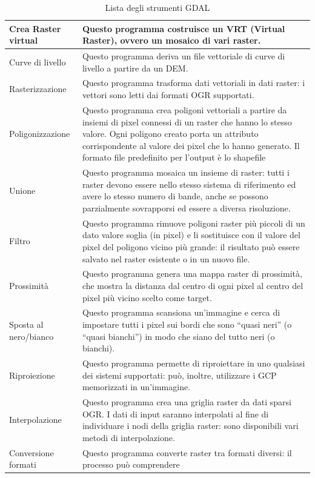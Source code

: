 {\setlength{\extrarowheight}{15pt}
\begin{longtable}{|p{3cm}|p{13cm}|}
\caption{Lista degli strumenti GDAL}\label{tab:gdaltools} \\
\hline
Crea Raster virtual& Questo programma costruisce un VRT (Virtual Raster), ovvero un mosaico di vari raster. \\
\hline Curve di livello & Questo programma deriva un file vettoriale di curve di livello a partire da un DEM.\\
\hline Rasterizzazione &  Questo programma trasforma dati vettoriali in dati raster: i vettori sono letti dai 
formati OGR supportati. \\
\hline Poligonizzazione & Questo programma crea poligoni vettoriali a partire da insiemi di pixel connessi di un raster 
che hanno lo stesso valore. Ogni poligono creato porta un attributo corrispondente al valore dei pixel che lo hanno generato.
Il formato file predefinito per l'output è lo shapefile \\
\hline Unione &  Questo programma mosaica un insieme di raster: tutti i raster devono essere nello stesso sistema di riferimento 
ed avere lo stesso numero di bande, anche se possono parzialmente sovrapporsi ed essere a diversa risoluzione. \\
\hline Filtro & Questo programma rimuove poligoni raster più piccoli di un dato valore soglia (in pixel) e li sostituisce 
con il valore del pixel del poligono vicino più grande: il risultato può essere salvato nel raster esistente o in un nuovo file. \\
\hline Prossimità & Questo programma genera una mappa raster di prossimità, che mostra la distanza dal centro di ogni pixel 
al centro del pixel più vicino scelto come target. \\
\hline Sposta al nero/bianco & Questo programma scansiona un'immagine e cerca di impostare tutti i pixel sui bordi che sono ``quasi neri'' 
(o ``quasi bianchi'') in modo che siano del tutto neri (o bianchi).\\
\hline Riproiezione & Questo programma permette di riproiettare in uno qualsiasi dei sistemi supportati: può, inoltre, 
utilizzare i GCP memorizzati in un'immagine. \\
\hline Interpolazione & Questo programma crea una griglia raster da dati sparsi OGR. I dati di input saranno interpolati 
al fine di individuare i nodi della griglia raster: sono disponibili vari metodi di interpolazione.\\
\hline Conversione formati & Questo programma converte raster tra formati diversi: il processo può comprendere 

\end{longtable}}
